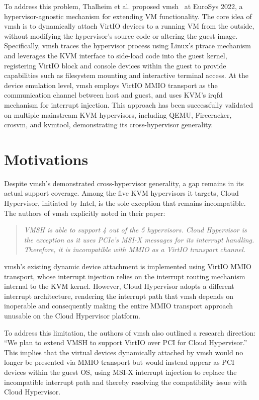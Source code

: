 \begin{ZhChapter}
To address this problem, Thalheim et al. proposed vmsh~\cite{Thalheim2022} at EuroSys 2022, a hypervisor-agnostic mechanism for extending VM functionality. The core idea of vmsh is to dynamically attach VirtIO devices to a running VM from the outside, without modifying the hypervisor's source code or altering the guest image. Specifically, vmsh traces the hypervisor process using Linux's ptrace mechanism and leverages the KVM interface to side-load code into the guest kernel, registering VirtIO block and console devices within the guest to provide capabilities such as filesystem mounting and interactive terminal access. At the device emulation level, vmsh employs VirtIO MMIO transport as the communication channel between host and guest, and uses KVM's irqfd mechanism for interrupt injection. This approach has been successfully validated on multiple mainstream KVM hypervisors, including QEMU, Firecracker, crosvm, and kvmtool, demonstrating its cross-hypervisor generality.

\section{Motivations}
\label{sec:motivations}

Despite vmsh's demonstrated cross-hypervisor generality, a gap remains in its actual support coverage. Among the five KVM hypervisors it targets, Cloud Hypervisor, initiated by Intel, is the sole exception that remains incompatible. The authors of vmsh explicitly noted in their paper:

\begin{quote}
\textit{VMSH is able to support 4 out of the 5 hypervisors. Cloud Hypervisor is the exception as it uses PCIe's MSI-X messages for its interrupt handling. Therefore, it is incompatible with MMIO as a VirtIO transport channel.}~\cite{Thalheim2022}
\end{quote}

vmsh's existing dynamic device attachment is implemented using VirtIO MMIO transport, whose interrupt injection relies on the interrupt routing mechanism internal to the KVM kernel. However, Cloud Hypervisor adopts a different interrupt architecture, rendering the interrupt path that vmsh depends on inoperable and consequently making the entire MMIO transport approach unusable on the Cloud Hypervisor platform.

To address this limitation, the authors of vmsh also outlined a research direction: ``We plan to extend VMSH to support VirtIO over PCI for Cloud Hypervisor.''~\cite{Thalheim2022} This implies that the virtual devices dynamically attached by vmsh would no longer be presented via MMIO transport but would instead appear as PCI devices within the guest OS, using MSI-X interrupt injection to replace the incompatible interrupt path and thereby resolving the compatibility issue with Cloud Hypervisor.


\end{ZhChapter}
